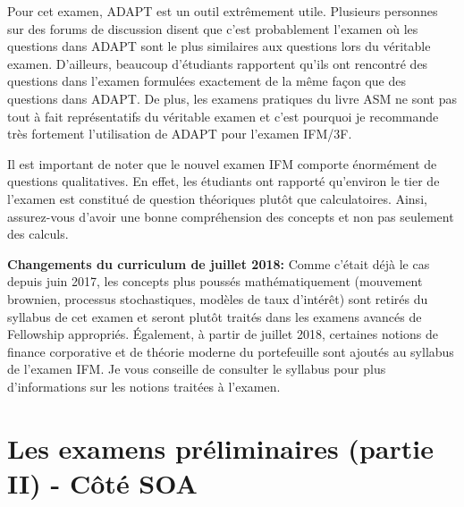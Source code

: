 Pour cet examen, ADAPT est un outil extrêmement utile. Plusieurs personnes sur des forums de discussion disent que c'est probablement l'examen où les questions dans ADAPT sont le plus similaires aux questions lors du véritable examen. D'ailleurs, beaucoup d'étudiants rapportent qu'ils ont rencontré des questions dans l'examen formulées exactement de la même façon que des questions dans ADAPT. De plus, les examens pratiques du livre ASM ne sont pas tout à fait représentatifs du véritable examen et c'est pourquoi je recommande très fortement l'utilisation de ADAPT pour l'examen IFM/3F.\vspace{\baselineskip}

Il est important de noter que le nouvel examen IFM comporte énormément de questions qualitatives. En effet, les étudiants ont rapporté qu'environ le tier de l'examen est constitué de question théoriques plutôt que calculatoires. Ainsi, assurez-vous d'avoir une bonne compréhension des concepts et non pas seulement des calculs.
\vspace{\baselineskip}

\textbf{Changements du curriculum de juillet 2018:} Comme c'était déjà le cas depuis juin 2017, les concepts plus poussés mathématiquement (mouvement brownien, processus stochastiques, modèles de taux d'intérêt) sont retirés du syllabus de cet examen et seront plutôt traités dans les examens avancés de Fellowship appropriés. Également, à partir de juillet 2018, certaines notions de finance corporative et de théorie moderne du portefeuille sont ajoutés au syllabus de l'examen IFM. Je vous conseille de consulter le syllabus pour plus d'informations sur les notions traitées à l'examen.


\newpage




\section*{Les examens préliminaires (partie II) - Côté SOA}
\label{sec:prelimssuitesoa}

